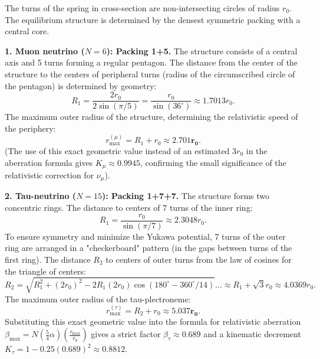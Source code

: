 \documentclass[11pt,a4paper]{article}
\begin{document}
	The turns of the spring in cross-section are non-intersecting circles of radius $r_0$. The equilibrium structure is determined by the densest symmetric packing with a central core.
	
	\textbf{1. Muon neutrino ($N=6$): Packing 1+5.}
	The structure consists of a central axis and 5 turns forming a regular pentagon. The distance from the center of the structure to the centers of peripheral turns (radius of the circumscribed circle of the pentagon) is determined by geometry:
	\begin{equation}
		R_1 = \frac{2 r_0}{2 \sin(\pi/5)} = \frac{r_0}{\sin(36^\circ)} \approx 1.7013 r_0.
	\end{equation}
	The maximum outer radius of the structure, determining the relativistic speed of the periphery:
	\begin{equation}
		r_{\text{max}}^{(\mu)} = R_1 + r_0 \approx \mathbf{2.701 r_0}.
	\end{equation}
	(The use of this exact geometric value instead of an estimated $3r_0$ in the aberration formula gives $K_\mu \approx 0.9945$, confirming the small significance of the relativistic correction for $\nu_\mu$).
	
	\textbf{2. Tau-neutrino ($N=15$): Packing 1+7+7.}
	The structure forms two concentric rings. The distance to centers of 7 turns of the inner ring:
	\begin{equation}
		R_1 = \frac{r_0}{\sin(\pi/7)} \approx 2.3048 r_0.
	\end{equation}
	To ensure symmetry and minimize the Yukawa potential, 7 turns of the outer ring are arranged in a "checkerboard" pattern (in the gaps between turns of the first ring). The distance $R_2$ to centers of outer turns from the law of cosines for the triangle of centers:
	\begin{equation}
		R_2 = \sqrt{R_1^2 + (2r_0)^2 - 2R_1(2r_0)\cos(180^\circ - 360^\circ/14)} \dots \approx R_1 + \sqrt{3}r_0 \approx 4.0369 r_0.
	\end{equation}
	The maximum outer radius of the tau-plectroneme:
	\begin{equation}
		r_{\text{max}}^{(\tau)} = R_2 + r_0 \approx \mathbf{5.037 r_0}.
	\end{equation}
	Substituting this exact geometric value into the formula for relativistic aberration $\beta_{\text{max}} = N (\frac{5}{4}\alpha) (\frac{r_{\text{max}}}{r_0})$ gives a strict factor $\beta_\tau \approx 0.689$ and a kinematic decrement $K_\tau = 1 - 0.25(0.689)^2 \approx \mathbf{0.8812}$.
	
\end{document}
